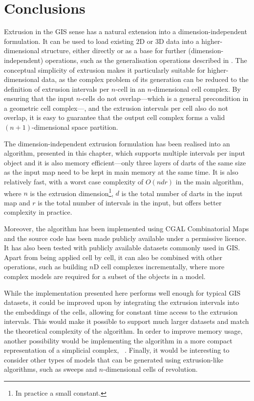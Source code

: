 \section{Conclusions}
\label{se:extrusion-conclusions}

Extrusion in the GIS sense has a natural extension into a dimension-independent formulation.
It can be used to load existing 2D or 3D data into a higher-dimensional structure, either directly or as a base for further (dimension-independent) operations, such as the generalisation operations described in .
The conceptual simplicity of extrusion makes it particularly suitable for higher-dimensional data, as the complex problem of its generation can be reduced to the definition of extrusion intervals per $n$-cell in an $n$-dimensional cell complex.
By ensuring that the input $n$-cells do not overlap---which is a general precondition in a geometric cell complex---, and the extrusion intervals per cell also do not overlap, it is easy to guarantee that the output cell complex forms a valid $(n+1)$-dimensional space partition.

The dimension-independent extrusion formulation has been realised into an algorithm, presented in this chapter, which supports multiple intervals per input object and it is also memory efficient---only three layers of darts of the same size as the input map need to be kept in main memory at the same time.
It is also relatively fast, with a worst case complexity of $O(ndr)$ in the main algorithm, where $n$ is the extrusion dimension\footnote{In practice a small constant.}, $d$ is the total number of darts in the input map and $r$ is the total number of intervals in the input, but offers better complexity in practice.

Moreover, the algorithm has been implemented using CGAL Combinatorial Maps and the source code has been made publicly available under a permissive licence.
It has also been tested with publicly available datasets commonly used in GIS.\@
Apart from being applied cell by cell, it can also be combined with other operations, such as building $n$D cell complexes incrementally, where more complex models are required for a subset of the objects in a model.

While the implementation presented here performs well enough for typical GIS datasets, it could be improved upon by integrating the extrusion intervals into the embeddings of the cells, allowing for constant time access to the extrusion intervals.
This would make it possible to support much larger datasets and match the theoretical complexity of the algorithm.
In order to improve memory usage, another possibility would be implementing the algorithm in a more compact representation of a simplicial complex, \eg\ \citet{Boissonnat12}.
Finally, it would be interesting to consider other types of models that can be generated using extrusion-like algorithms, such as sweeps and $n$-dimensional cells of revolution.
